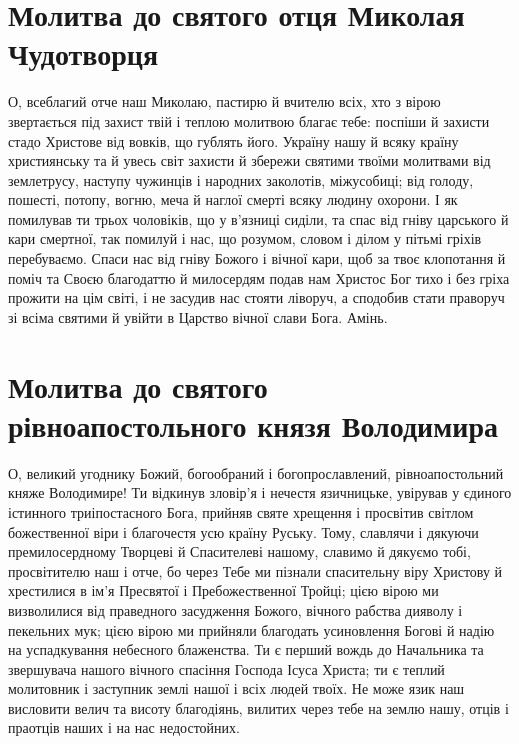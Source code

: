\documentclass[chapters.tex]{subfiles}
\begin{document}
\section{Молитва до святого отця Миколая Чудотворця}
О, всеблагий отче наш Миколаю, пастирю й вчителю всіх, хто з вірою звертається під захист твій і теплою молитвою благає тебе: поспіши й захисти стадо Христове від вовків, що гублять його. Україну нашу й всяку країну християнську та й увесь світ захисти й збережи святими твоїми молитвами від землетрусу, наступу чужинців і народних заколотів, міжусобиці; від голоду, пошесті, потопу, вогню, меча й наглої смерті всяку людину охорони. І як помилував ти трьох чоловіків, що у в’язниці сиділи, та спас від гніву царського й кари смертної, так помилуй і нас, що розумом, словом і ділом у пітьмі гріхів перебуваємо. Спаси нас від гніву Божого і вічної кари, щоб за твоє клопотання й поміч та Своєю благодаттю й милосердям подав нам Христос Бог тихо і без гріха прожити на цім світі, і не засудив нас стояти ліворуч, а сподобив стати праворуч зі всіма святими й увійти в Царство вічної слави Бога. Амінь.

\section{Молитва до святого рівноапостольного князя Володимира}
О, великий угоднику Божий, богообраний і богопрославлений, рівноапостольний княже Володимире! Ти відкинув зловір’я і нечестя язичницьке, увірував у єдиного істинного триіпостасного Бога, прийняв святе хрещення і просвітив світлом божественної віри і благочестя усю країну Руську. Тому, славлячи і дякуючи премилосердному Творцеві й Спасителеві нашому, славимо й дякуємо тобі, просвітителю наш і отче, бо через Тебе ми пізнали спасительну віру Христову й хрестилися в ім’я Пресвятої і Пребожественної Тройці; цією вірою ми визволилися від праведного засудження Божого, вічного рабства дияволу і пекельних мук; цією вірою ми прийняли благодать усиновлення Богові й надію на успадкування небесного блаженства. Ти є перший вождь до Начальника та звершувача нашого вічного спасіння Господа Ісуса Христа; ти є теплий молитовник і заступник землі нашої і всіх людей твоїх. Не може язик наш висловити велич та висоту благодіянь, вилитих через тебе на землю нашу, отців і праотців наших і на нас недостойних.
\end{document}
